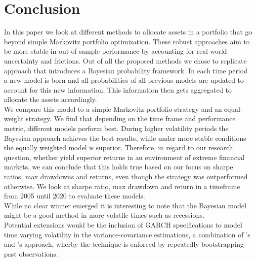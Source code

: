 \section{Conclusion}
In this paper we look at different methods to allocate assets in a portfolio that go beyond simple Markovitz portfolio optimization. These robust approaches aim to be more stable in out-of-sample performance by accounting for real world uncertainty and frictions. Out of all the proposed methods we chose to replicate \cite{anderson_cheng_2016} approach that introduces a Bayesian probability framework. In each time period a new model is born and all probabilities of all previous models are updated to account for this new information. This information then gets aggregated to allocate the assets accordingly.\\
We compare this model to a simple Markovitz portfolio strategy and an equal-weight strategy. We find that depending on the time frame and performance metric, different models perform best. During higher volatility periods the Bayesian approach achieves the best results, while under more stable conditions the equally weighted model is superior. Therefore, in regard to our research question, whether  yield superior returns in an environment of extreme financial markets, we can conclude that this holds true based on our focus on sharpe ratios, max drawdowns and returns, even though the strategy was outperformed otherwise.
We look at sharpe ratio, max drawdown and return in a timeframe from 2005 until 2020 to evaluate these models. \\
While no clear winner emerged it is interesting to note that the Bayesian model might be a good method in more volatile times such as recessions.\\ Potential extensions would be the inclusion of GARCH specifications to model time varying volatility in the variance-covariance estimations, a combination of \citeauthor{anderson_cheng_2016}'s and \citeauthor{michaud_2007}'s approach, wherby the  technique is enforced by repeatedly bootstrapping past observations.
